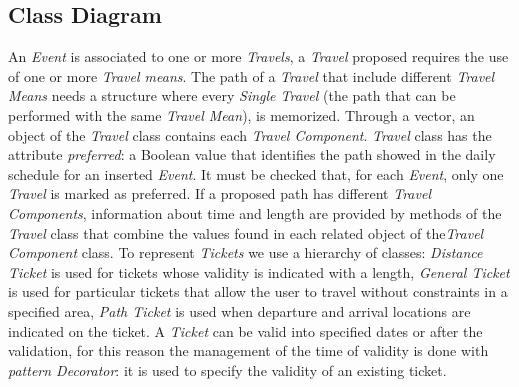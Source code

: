 \subsection{Class Diagram}
\noindent{}
\newline
An \textit{Event} is associated to one or more \textit{Travels}, a \textit{Travel} proposed requires the use of one or more \textit{Travel means}. The path of a \textit{Travel} that include different \textit{Travel Means} needs a structure where every \textit{Single Travel} (the path that can be performed with the same \textit{Travel Mean}), is memorized. Through a vector, an object of the \textit{Travel} class contains each \textit{Travel Component}.
\newline
\newline
\textit{Travel} class has the attribute \textit{preferred}: a Boolean value that identifies the path showed in the daily schedule for an inserted \textit{Event}. It must be checked that, for each \textit{Event}, only one \textit{Travel} is marked as preferred.
\newline
If a proposed path has different \textit{Travel Components}, information about time and length are provided by methods of the \textit{Travel} class that combine the values found in each related object of the\textit{Travel Component} class.
\newline
\newline
To represent \textit{Tickets} we use a hierarchy of classes: \textit{Distance Ticket} is used for tickets whose validity is indicated with a length, \textit{General Ticket} is used for particular tickets that allow the user to travel without constraints in a specified area, \textit{Path Ticket} is used when departure and arrival locations are indicated on the ticket. 
\newline
A \textit{Ticket} can be valid into specified dates or after the validation, for this reason the management of the time of validity is done with \textit{pattern Decorator}: it is used to specify the validity of an existing ticket.
